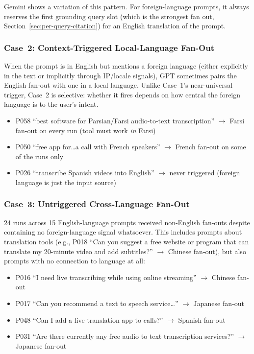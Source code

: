 Gemini shows a variation of this pattern. For foreign-language prompts, it always 
reserves the first grounding query slot (which is the strongest fan out, Section~\ref{sec:per-query-citation}) for an English translation of the prompt.

\subsubsection{Case~2: Context-Triggered Local-Language Fan-Out}

When the prompt is in English but mentions a foreign language (either explicitly in the text or implicitly through IP/locale signals), GPT sometimes pairs the English fan-out with one in a local language. Unlike Case~1's near-universal trigger, Case~2 is selective: whether it fires depends on how central the foreign language is to the user's intent.

\begin{itemize}
    \item P058 ``best software for Parsian/Farsi audio-to-text transcription'' $\rightarrow$ Farsi fan-out on every run (tool must work \emph{in} Farsi)
    \item P050 ``free app for\ldots a call with French speakers'' $\rightarrow$ French fan-out on some of the runs only
    \item P026 ``transcribe Spanish videos into English'' $\rightarrow$ never triggered (foreign language is just the input source)
\end{itemize}

\subsubsection{Case~3: Untriggered Cross-Language Fan-Out}
\label{sec:untriggered-cross-lang}

24 runs across 15 English-language prompts received non-English fan-outs despite containing no foreign-language signal whatsoever. This includes prompts about translation tools (e.g., P018 ``Can you suggest a free website or program that can translate my 20-minute video and add subtitles?'' $\rightarrow$ Chinese fan-out), but also prompts with no connection to language at all:

\begin{itemize}
    \item P016 ``I need live transcribing while using online streaming'' $\rightarrow$ Chinese fan-out
    \item P017 ``Can you recommend a text to speech service\ldots'' $\rightarrow$ Japanese fan-out
    \item P048 ``Can I add a live translation app to calls?'' $\rightarrow$ Spanish fan-out
    \item P031 ``Are there currently any free audio to text transcription services?'' $\rightarrow$ Japanese fan-out
\end{itemize}

